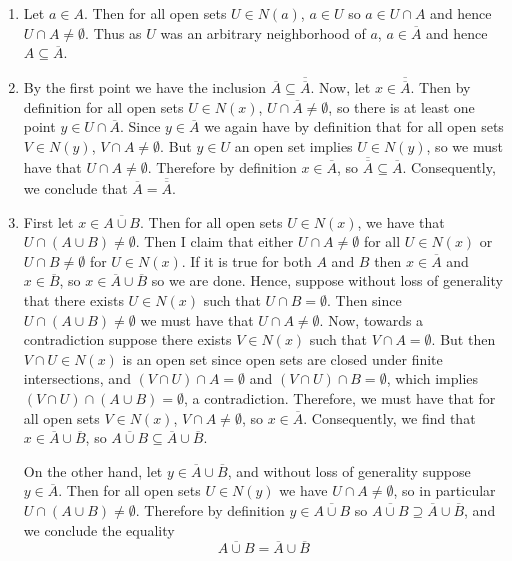 \documentclass[12pt, a4paper, twoside, openright, titlepage]{book}
\begin{document}
\begin{proof*}{}{}
    \leavevmode
    \begin{enumerate}
        \item Let $a \in A$. Then for all open sets $U \in N(a)$, $a \in U$ so $a \in U\cap A$ and hence $U\cap A \neq \emptyset$. Thus as $U$ was an arbitrary neighborhood of $a$, $a \in \overline{A}$ and hence $A \subseteq \overline{A}$.
        \item By the first point we have the inclusion $\overline{A} \subseteq \overline{\overline{A}}$. Now, let $x \in \overline{\overline{A}}$. Then by definition for all open sets $U \in N(x)$, $U \cap \overline{A} \neq \emptyset$, so there is at least one point $y \in U \cap \overline{A}$. Since $y \in \overline{A}$ we again have by definition that for all open sets $V \in N(y)$, $V \cap A \neq \emptyset$. But $y \in U$ an open set implies $U \in N(y)$, so we must have that $U \cap A \neq \emptyset$. Therefore by definition $x \in \overline{A}$, so $\overline{\overline{A}} \subseteq \overline{A}$. Consequently, we conclude that $\overline{A} = \overline{\overline{A}}$.
        \item First let $x \in \overline{A\cup B}$. Then for all open sets $U \in N(x)$, we have that $U \cap(A\cup B) \neq \emptyset$. Then I claim that either $U\cap A \neq \emptyset$ for all $U \in N(x)$ or $U\cap B \neq \emptyset$ for $U \in N(x)$. If it is true for both $A$ and $B$ then $x \in \overline{A}$ and $x \in \overline{B}$, so $x \in \overline{A}\cup\overline{B}$ so we are done. Hence, suppose without loss of generality that there exists $U \in N(x)$ such that $U\cap B = \emptyset$. Then since $U\cap(A\cup B) \neq \emptyset$ we must have that $U \cap A\neq \emptyset$. Now, towards a contradiction suppose there exists $V \in N(x)$ such that $V\cap A = \emptyset$. But then $V\cap U \in N(x)$ is an open set since open sets are closed under finite intersections, and $(V\cap U)\cap A = \emptyset$ and $(V\cap U)\cap B = \emptyset$, which implies $(V\cap U)\cap (A\cup B) = \emptyset$, a contradiction. Therefore, we must have that for all open sets $V \in N(x)$, $V\cap A \neq \emptyset$, so $x \in \overline{A}$. Consequently, we find that $x \in \overline{A}\cup\overline{B}$, so $\overline{A\cup B} \subseteq \overline{A}\cup\overline{B}$.

            On the other hand, let $y \in \overline{A} \cup \overline{B}$, and without loss of generality suppose $y \in \overline{A}$. Then for all open sets $U \in N(y)$ we have $U \cap A \neq \emptyset$, so in particular $U \cap (A\cup B) \neq \emptyset$. Therefore by definition $y \in \overline{A\cup B}$ so $\overline{A\cup B}\supseteq \overline{A}\cup\overline{B}$, and we conclude the equality $$\overline{A\cup B} = \overline{A}\cup\overline{B}$$


\end{enumerate}
\end{proof*}
\end{document}
